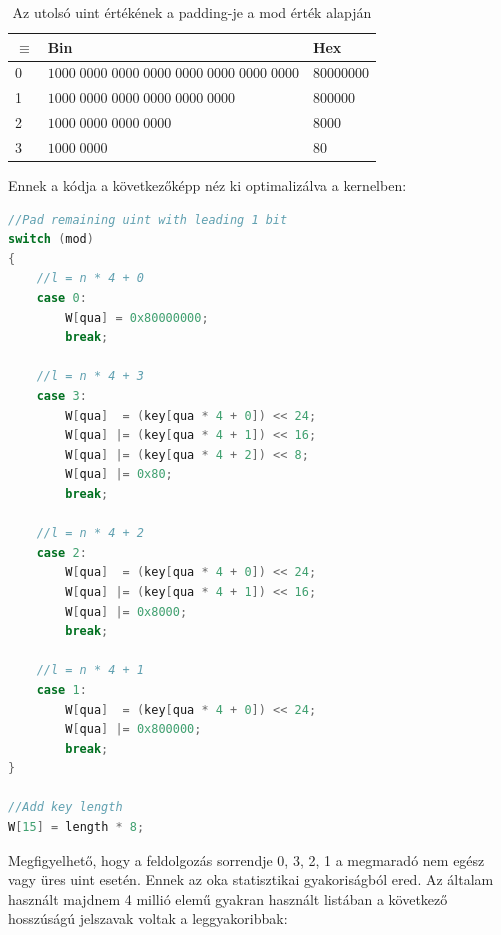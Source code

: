 \begin{table}[H]
    \begin{tabular}{l|l|l}
        $\equiv$  & Bin                                              & Hex          \\
          \hline
    0 & $1000\;0000\;0000\;0000\;0000\;0000\;0000\;0000$ & $80000000$ \\
    1 & $1000\;0000\;0000\;0000\;0000\;0000$             & $800000$   \\
    2 & $1000\;0000\;0000\;0000$                         & $8000$     \\
    3 & $1000\;0000$                                     & $80$      
        
    \end{tabular}
    \caption{Az utolsó uint értékének a padding-je a mod érték alapján}
\end{table}

Ennek a kódja a következőképp néz ki optimalizálva a kernelben:

\begin{lstlisting}[language={C++}]
//Pad remaining uint with leading 1 bit
switch (mod)
{
    //l = n * 4 + 0
    case 0:
        W[qua] = 0x80000000;
        break;

    //l = n * 4 + 3
    case 3:
        W[qua]  = (key[qua * 4 + 0]) << 24;
        W[qua] |= (key[qua * 4 + 1]) << 16;
        W[qua] |= (key[qua * 4 + 2]) << 8;
        W[qua] |= 0x80;
        break;

    //l = n * 4 + 2
    case 2:
        W[qua]  = (key[qua * 4 + 0]) << 24;
        W[qua] |= (key[qua * 4 + 1]) << 16;
        W[qua] |= 0x8000;
        break;

    //l = n * 4 + 1
    case 1:
        W[qua]  = (key[qua * 4 + 0]) << 24;
        W[qua] |= 0x800000;
        break;
}

//Add key length
W[15] = length * 8;
\end{lstlisting}

Megfigyelhető, hogy a feldolgozás sorrendje 0, 3, 2, 1 a megmaradó nem egész vagy üres uint esetén. Ennek az oka statisztikai gyakoriságból ered. Az általam használt majdnem 4 millió elemű gyakran használt listában a következő hosszúságú jelszavak voltak a leggyakoribbak:


